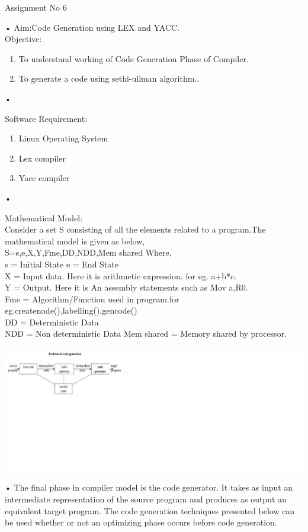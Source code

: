 \documentclass[11pt]{article}
\begin{document}
	\begin{center}
		\begin{Large}
			Assignment No 6
		\end{Large}
	\end{center}•
	Aim:Code Generation using LEX and YACC.\\
	
	\noindent
	Objective:
	\begin{enumerate}
		\item To understand working of Code Generation Phase of Compiler.
		\item To generate a code using sethi-ullman algorithm..
	\end{enumerate}•
	
	\noindent
	Software Requirement:
	\begin{enumerate}
		\item Linux Operating System
		\item Lex compiler
		\item Yacc compiler
	\end{enumerate}•
	
	\noindent
	Mathematical Model:\\
	Consider a set S consisting of all the elements related to a program.The mathematical model is given as below,\\
	S={s,e,X,Y,Fme,DD,NDD,Mem shared} Where,\\ s = Initial State e = End State\\
	X	= Input data. Here it is arithmetic expression. for eg. a+b*c.\\
	Y	= Output. Here it is An assembly statements such as Mov a,R0.\\
	Fme = Algorithm/Function used in program.for eg.{createnode(),labelling(),gencode()}\\
	DD = Deterministic Data\\
	NDD = Non deterministic Data Mem shared = Memory shared by processor.\\
	
	
	\begin{center}
		\includegraphics{te.png}
	\end{center}•
	The final phase in compiler model is the code generator. It takes as input an intermediate representation of the source program and produces as output an equivalent target program. The code generation techniques presented below can be used whether or not an optimizing phase occurs before code generation.\\
	
\end{document}
